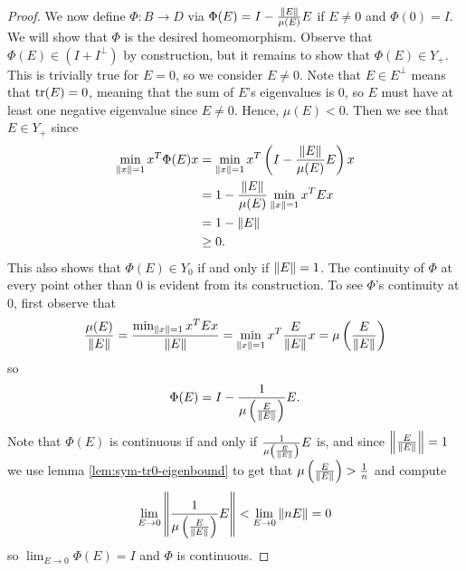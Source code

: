 \begin{proposition}
\begin{proof}
        We now define $\Phi : B \to D$ via $\Phi(E) =  I - \frac{\left\| E \right\|}{\mu(E)}E$ if $E \neq 0$ and $\Phi(0) = I$.
        We will show that $\Phi$ is the desired homeomorphism.
        Observe that $\Phi(E) \in (I + I^\perp)$ by construction, but it remains to show that $\Phi(E) \in Y_+$.
        This is trivially true for $E = 0$, so we consider $E \neq 0$.
        Note that $E \in E^\perp$ means that $\operatorname{tr}(E) = 0$, meaning that the sum of $E$'s eigenvalues is $0$, so $E$ must have at least one negative eigenvalue since $E \neq 0$.
        Hence, $\mu(E) < 0$.
        Then we see that $E \in Y_+$ since
        \begin{align*}
            \min_{\left\| x \right\| = 1} x^T \Phi(E) x
            &= \min_{\left\| x \right\| = 1} x^T \left( I - \frac{\left\| E \right\|}{\mu(E)}E \right) x \\
            &= 1  - \frac{\left\| E \right\|}{\mu(E)} \min_{\left\| x \right\| = 1} x^T E x \\
            &= 1 - \left\| E \right\| \\
            &\geq 0.
        \end{align*}
        This also shows that $\Phi(E) \in Y_0$ if and only if $\left\| E \right\| = 1$.
        The continuity of $\Phi$ at every point other than $0$ is evident from its construction.
        To see $\Phi$'s continuity at $0$, first observe that
        \[
            \frac{\mu(E)}{\left\| E \right\|}
            = \frac{\min_{\left\| x \right\| = 1} x^T E x}{\left\| E \right\|}
            = \min_{\left\| x \right\| = 1} x^T \frac{E}{\left\| E \right\|} x
            = \mu\left( \frac{E}{\left\| E \right\|} \right)
        \]
        so
        \[
            \Phi(E) = I - \frac{1}{\mu\left( \frac{E}{\left\| E \right\|} \right)} E.
        \]
        Note that $\Phi(E)$ is continuous if and only if $\frac{1}{\mu\left( \frac{E}{\left\| E \right\|} \right)} E$ is, and since $\left\| \frac{E}{\left\| E \right\|} \right\| = 1$ we use lemma \ref{lem:sym-tr0-eigenbound} to get that $\mu\left( \frac{E}{\left\| E \right\|} \right) > \frac{1}{n}$ and  compute
        \[
            \lim_{E \to 0} \left\| \frac{1}{\mu\left( \frac{E}{\left\| E \right\|} \right)} E \right\|
            < \lim_{E \to 0} \left\| n E \right\|
            = 0
        \]
        so $\lim_{E \to 0} \Phi(E) = I$ and $\Phi$ is continuous.
        

\end{proof}
\end{proposition}
